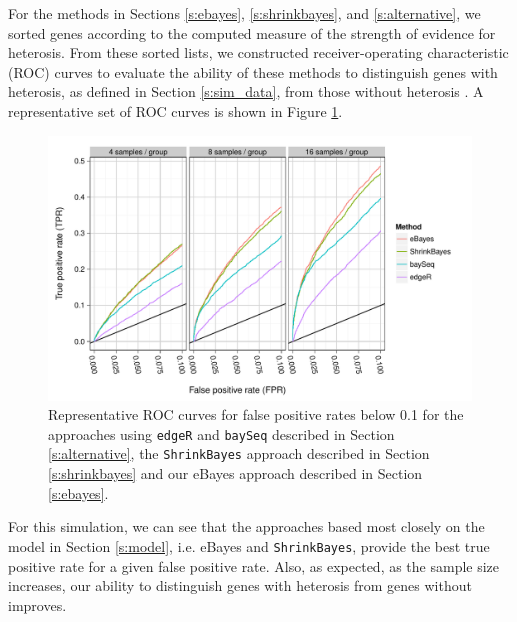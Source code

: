 \documentclass[useAMS,usenatbib,referee]{biom}
\newcommand{\edgeR}{{\tt edgeR}}
\newcommand{\baySeq}{{\tt baySeq}}
\newcommand{\ShrinkBayes}{{\tt ShrinkBayes}}
\begin{document}
For the methods in Sections \ref{s:ebayes}, \ref{s:shrinkbayes}, and \ref{s:alternative}, we sorted genes according to the computed measure of the strength of evidence for heterosis. From these sorted lists, we constructed receiver-operating characteristic (ROC) curves to evaluate the ability of these methods to distinguish genes with heterosis, as defined in Section \ref{s:sim_data}, 
from those without heterosis \citep{landau2013dispersion}. A representative set of ROC curves is shown in Figure \ref{f:roc}. 
\begin{figure}[htbp]
\centerline{\includegraphics[width=\textwidth]{exampleROC0_1}}
\caption{Representative ROC curves for false positive rates below 0.1 for the approaches using \edgeR{} and \baySeq{} described in Section \ref{s:alternative}, the \ShrinkBayes{} approach described in Section \ref{s:shrinkbayes} and our eBayes approach described in Section \ref{s:ebayes}.}
\label{f:roc}
\end{figure}
For this simulation, we can see that the approaches based most closely on the model in Section \ref{s:model}, i.e. eBayes and \ShrinkBayes{}, provide the best true positive rate for a given false positive rate. Also, as expected, as the sample size increases, our ability to distinguish genes with heterosis from genes without improves. 
\end{document}
